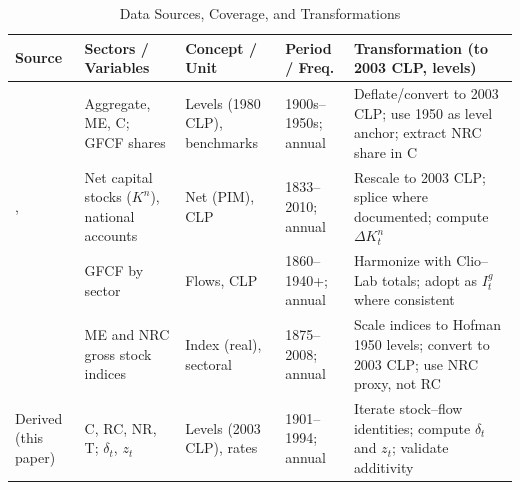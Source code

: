 \begin{table}[h]
\centering
\small
\caption{Data Sources, Coverage, and Transformations}
\label{tab:data_sources}
\begin{tabular}{p{2.9cm} p{3.1cm} p{3.1cm} p{3.1cm} p{3.1cm}}
\toprule
\textbf{Source} & \textbf{Sectors / Variables} & \textbf{Concept / Unit} & \textbf{Period / Freq.} & \textbf{Transformation (to 2003 CLP, levels)} \\
\midrule
\citet{Hofman2000} &
Aggregate, ME, C; GFCF shares &
Levels (1980 CLP), benchmarks &
1900s--1950s; annual &
Deflate/convert to 2003 CLP; use 1950 as level anchor; extract NRC share in C \\
\addlinespace
\citet{Luders2016}, \citet{Diaz2016} &
Net capital stocks ($K^n$), national accounts &
Net (PIM), CLP &
1833--2010; annual &
Rescale to 2003 CLP; splice where documented; compute $\Delta K^n_t$ \\
\addlinespace
\citet{PerezEyzaguirre2019} &
GFCF by sector &
Flows, CLP &
1860--1940+; annual &
Harmonize with Clio--Lab totals; adopt as $I^g_t$ where consistent \\
\addlinespace
\citet{Tafunell2016} &
ME and NRC gross stock indices &
Index (real), sectoral &
1875--2008; annual &
Scale indices to Hofman 1950 levels; convert to 2003 CLP; use NRC proxy, not RC \\
\addlinespace
Derived (this paper) &
C, RC, NR, T; $\delta_t$, $z_t$ &
Levels (2003 CLP), rates &
1901--1994; annual &
Iterate stock--flow identities; compute $\delta_t$ and $z_t$; validate additivity \\
\bottomrule
\end{tabular}
\end{table}